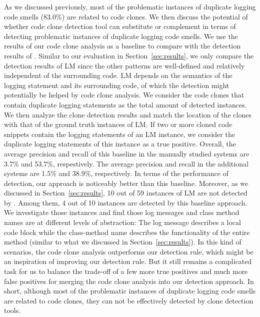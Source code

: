  As we discussed previously, most of the problematic instances of duplicate logging code smells (83.0\%) are related to code clones. We then discuss the potential of whether code clone detection tool can substitute or complement \toolS in terms of detecting problematic instances of duplicate logging code smells. We use the results of our code clone analysis as a baseline to compare with the detection results of \tool. Similar to our evaluation in Section~\ref{sec:results}, we only compare the detection results of LM since the other patterns are well-defined and relatively independent of the surrounding code. LM depends on the semantics of the logging statement and its surrounding code, of which the detection might potentially be helped by code clone analysis. We consider the code clones that contain duplicate logging statements as the total amount of detected instances. We then analyze the clone detection results and match the location of the clones with that of the ground truth instances of LM. If two or more cloned code snippets contain the logging statements of an LM instance, we consider the duplicate logging statements of this instance as a true positive. Overall, the average precision and recall of this baseline in the manually studied systems are 3.7\% and 53.7\%, respestively. The average precision and recall in the additional systems are 1.5\% and 38.9\%, respectively. In terms of the performance of detection, our approach is noticeably better than this baseline. Moreover, as we discussed in Section~\ref{sec:results}, 10 out of 59 instances of LM are not detected by \tool. Among them, 4 out of 10 instances are detected by this baseline approach. We investigate those instances and find those log messages and class method names are at different levels of abstraction: The log message describes a local code block while the class-method name describes the functionality of the entire method (similar to what we discussed in Section~\ref{sec:results}). In this kind of scenarios, the code clone analysis outperforms our detection rule, which might be an inspiration of improving our detection rule. But it still remains a complicated task for us to balance the trade-off of a few more true positives and much more false positives for merging the code clone analysis into our detection approach. In short, although most of the problematic instances of duplicate logging code smells are related to code clones, they can not be effectively detected by clone detection tools.
\vspace{-0.1cm}

